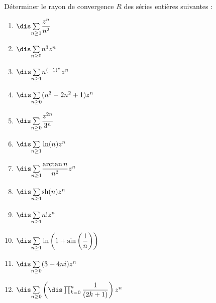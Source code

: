 \documentclass[a4paper,10pt]{report}
\newcommand{\Sum}[2]{\ensuremath{\textstyle{\sum\limits_{#1}^{#2}}}}
\begin{document}
\begin{Exa} Déterminer le rayon de convergence $R$ des séries entières suivantes :

\begin{multicols}{3}
\begin{enumerate}
\item $\dis \Sum{n \geq 1}{} \dfrac{z^n}{n^2}$
\item $\dis \Sum{n \geq 0}{} n^3 z^n$
\item $\dis \Sum{n \geq 1}{} n^{(-1)^n}z^n$
\item $\dis \Sum{n \geq 0}{} (n^3-2n^2+1)z^n$
\columnbreak
\item $\dis \Sum{n \geq 0}{} \dfrac{z^{2n}}{3^n}$
\item $\dis \Sum{n \geq 1}{} \ln(n) z^n$
\item $\dis \Sum{n \geq 1}{} \dfrac{\arctan n}{n^2}z^n$
\item $\dis \Sum{n \geq 1}{} \textrm{sh}(n) z^n$
\columnbreak
\item $\dis \Sum{n \geq 1}{} n! z^n$
\item $\dis \Sum{n \geq 1}{}\ln\left(1+\sin \left(\dfrac{1}{n}\right) \right)$
\item $\dis \Sum{n \geq 0}{} (3+4ni) z^n$
\item $\dis \Sum{n \geq 0}{}   \left(\dis \prod_{k=0}^n\dfrac{1}{(2k+1)}\right) z^n$
\end{enumerate}
\end{multicols}

\medskip

\end{Exa}


\corr
\end{document}
